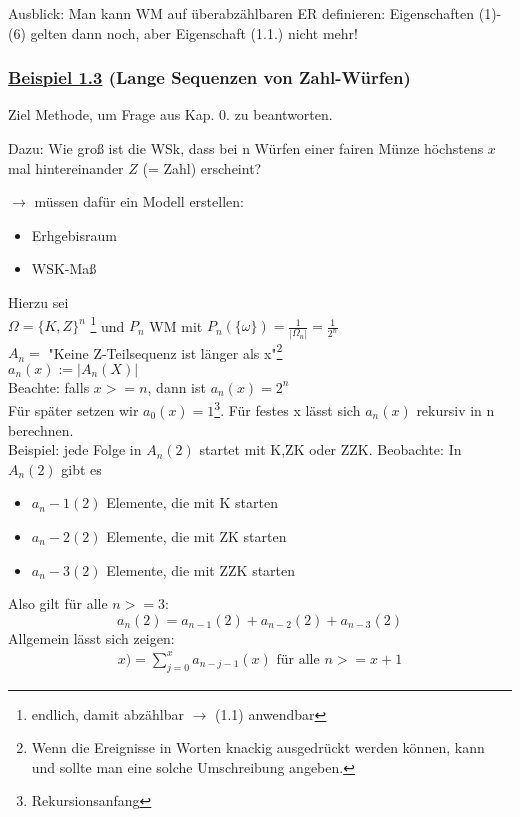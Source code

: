 \documentclass[10pt,a4paper,titlepage]{book}
\begin{document}
Ausblick: Man kann WM auf überabzählbaren ER definieren: Eigenschaften (1)-(6) gelten dann noch, aber Eigenschaft (1.1.) nicht mehr!

\subsubsection{\underline{Beispiel 1.3} (Lange Sequenzen von Zahl-Würfen)}

Ziel Methode, um Frage aus Kap. 0. zu beantworten.

Dazu: Wie groß ist die WSk, dass bei n Würfen einer fairen Münze höchstens $x$ mal hintereinander $Z$ (= Zahl) erscheint?

$\rightarrow$ müssen dafür ein Modell erstellen:
\begin{itemize}
\item Erhgebisraum
\item WSK-Maß
\end{itemize}
Hierzu sei \\$\Omega = \{K,Z\}^n$ \footnote{endlich, damit abzählbar $\rightarrow$ (1.1) anwendbar} und $P_n$ WM mit $P_n(\{\omega\}) = \frac{1}{|\Omega_n|} = \frac{1}{2^n}$
\\
$A_n =$  "Keine Z-Teilsequenz ist länger als x"\footnote{Wenn die Ereignisse in Worten knackig ausgedrückt werden können, kann und sollte man eine solche Umschreibung angeben.}\\
$a_n(x) := |A_n(X)|$\\
Beachte: falls $x>=n$, dann ist $a_n(x)=2^n$\\
Für später setzen wir $a_0(x)=1$\footnote{Rekursionsanfang}. Für festes x lässt sich $a_n(x)$ rekursiv in n berechnen.\\

Beispiel: jede Folge in $A_n(2)$ startet mit K,ZK oder ZZK.
Beobachte: In $A_n(2)$ gibt es
\begin{itemize}
\item $a_n-1(2)$ Elemente, die mit K starten
\item $a_n-2(2)$ Elemente, die mit ZK starten
\item $a_n-3(2)$ Elemente, die mit ZZK starten
\end{itemize}

Also  gilt für alle $n>=3$:
$$a_n(2) = a_{n-1}(2)+a_{n-2}(2)+a_{n-3}(2)$$
Allgemein lässt sich zeigen:
\begin{align}
x)=\sum_{j=0}^x a_{n-j-1}(x) \text{ für alle } n >= x+1
\end{align}
\end{document}
